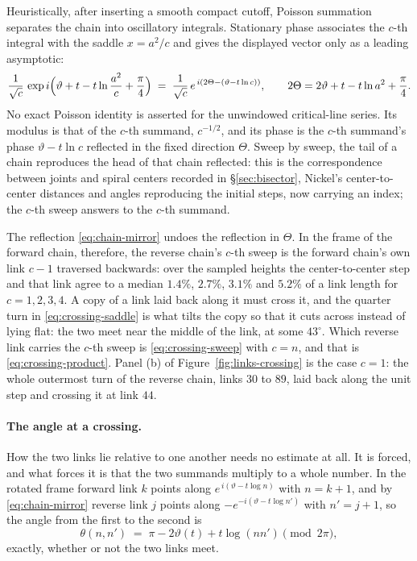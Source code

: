 \documentclass[11pt]{article}
\theoremstyle{definition}
\begin{document}
Heuristically, after inserting a smooth compact cutoff, Poisson summation
separates the chain into oscillatory integrals. Stationary phase associates
the $c$-th integral with the saddle $x=a^2/c$ and gives the displayed vector
only as a leading asymptotic:
\begin{equation}\label{eq:crossing-saddle}
\frac{1}{\sqrt c}\,
\exp i\Bigl(\vartheta+t-t\ln\frac{a^{2}}{c}+\frac\pi4\Bigr)
\;=\;\frac{1}{\sqrt c}\,e^{\,i\left(2\Theta-(\vartheta-t\ln c)\right)},
\qquad
2\Theta=2\vartheta+t-t\ln a^{2}+\frac\pi4 .
\end{equation}
No exact Poisson identity is asserted for the unwindowed critical-line
series.
Its modulus is that of the $c$-th summand, $c^{-1/2}$, and its phase is the
$c$-th summand's phase $\vartheta-t\ln c$ reflected in the fixed direction
$\Theta$. Sweep by sweep, the tail of a chain reproduces the head of that chain
reflected: this is the correspondence between joints and spiral centers
recorded in \S\ref{sec:bisector}, Nickel's center-to-center distances and
angles reproducing the initial steps, now carrying an index; the $c$-th sweep
answers to the $c$-th summand.

The reflection \eqref{eq:chain-mirror} undoes the
reflection in $\Theta$. In the frame of the forward chain, therefore, the reverse chain's $c$-th
sweep is the forward chain's own link $c-1$ traversed backwards: over the
sampled heights the center-to-center step and that link agree to a median
$1.4\%$, $2.7\%$, $3.1\%$ and $5.2\%$ of a link length for $c=1,2,3,4$. A copy
of a link laid back along it must cross it, and the quarter turn in
\eqref{eq:crossing-saddle} is what tilts the copy so that it cuts across
instead of lying flat: the two meet near the middle of the link, at some
$43^{\circ}$. Which reverse link carries the $c$-th sweep is
\eqref{eq:crossing-sweep} with $c=n$, and that is
\eqref{eq:crossing-product}. Panel (b) of Figure~\ref{fig:links-crossing} is
the case $c=1$: the whole outermost turn of the reverse chain, links $30$ to
$89$, laid back along the unit step and crossing it at link $44$.

\paragraph{The angle at a crossing.} How the two links lie relative to one
another needs no estimate at all. It is forced, and what forces it is that the
two summands multiply to a whole number.
In the rotated frame forward link $k$ points
along $e^{\,i(\vartheta-t\log n)}$ with $n=k+1$, and by \eqref{eq:chain-mirror}
reverse link $j$ points along $-e^{-i(\vartheta-t\log n')}$ with $n'=j+1$, so
the angle from the first to the second is
\begin{equation}\label{eq:crossing-angle}
\theta(n,n')\;=\;\pi-2\vartheta(t)+t\log(n n')\pmod{2\pi},
\end{equation}
exactly, whether or not the two links meet.
\end{document}
